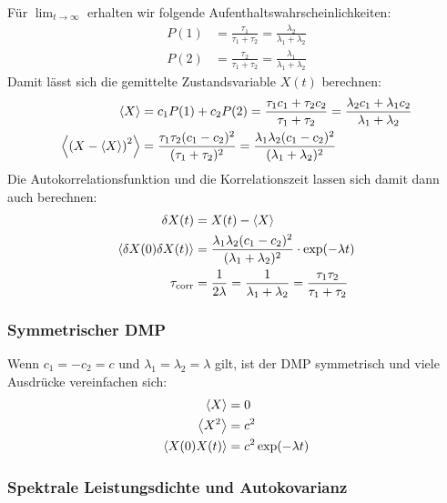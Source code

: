 \documentclass[main.tex]{subfiles}
\begin{document}
Für \( \lim_{t \to \infty} \) erhalten wir folgende Aufenthaltswahrscheinlichkeiten:
\begin{align}
	P(1)                            & = \frac{\tau_1}{\tau_1 + \tau_2} =
	\frac{\lambda_2 }{\lambda_1 +
		\lambda_2}
	\\
	P(2)                            & = \frac{\tau_2}{\tau_1 + \tau_2} =
	\frac{\lambda_1 }{\lambda_1 +
		\lambda_2}
\end{align}
Damit lässt sich die gemittelte Zustandsvariable \(X(t)\) berechnen:
\begin{align}
	\expval{X}                      & = c_1 P(1) + c_2 P(2) = \frac{\tau_1
		c_1 + \tau_2
		c_2}{\tau_1 + \tau_2} = \frac{\lambda_2 c_1 + \lambda_1
		c_2}{\lambda_1 +
		\lambda_2}
	\\
	\expval{\qty(X - \expval{X})^2} & = \frac{\tau_1 \tau_2
		(c_1-c_2)^2}{(\tau_1 + \tau_2)^2} = \frac{\lambda_1 \lambda_2
		(c_1-c_2)^2}{(\lambda_1 + \lambda_2)^2}
\end{align}
Die Autokorrelationsfunktion und die Korrelationszeit lassen sich damit dann auch berechnen:
\begin{align}
	\delta X(t) & = X(t) - \expval{X}\\
	\expval{\delta X(0)\delta X(t)} &= \frac{\lambda_1 \lambda_2
	(c_1-c_2)^2}{(\lambda_1 + \lambda_2)^2} \cdot \exp(-\lambda t)\\
	\tau_\mathrm{corr} &= \frac{1}{2\lambda} = \frac{1}{\lambda_1 +
		\lambda_2} = \frac{\tau_1 \tau_2}{\tau_1 + \tau_2}
\end{align}

\subsubsection*{Symmetrischer DMP}

Wenn \(c_1=-c_2=c\) und \(\lambda_1 = \lambda_2 = \lambda\) gilt, ist der DMP
symmetrisch und viele Ausdrücke vereinfachen sich:
\begin{align}
	\expval{X}        & = 0                    \\
	\expval{X^2}      & = c^2                  \\
	\expval{X(0)X(t)} & = c^2 \exp(-\lambda t)
\end{align}\cite{matphys}
\subsubsection*{Spektrale Leistungsdichte und Autokovarianz}
\end{document}
